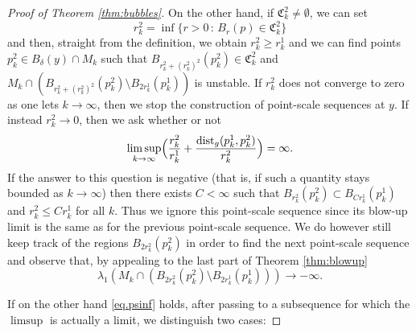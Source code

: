 \documentclass[10pt]{amsart}
\newcounter{cas}
\renewcommand{\thecas}{\Roman{cas}}
\newcommand{\sep}{\,:\,}
\DeclareMathOperator{\dist}{dist}
\theoremstyle{definition}
\begin{document}
\begin{proof}[Proof of Theorem \ref{thm:bubbles}]
On the other hand, if $\mathfrak{C}^2_k \neq \emptyset$, we can set
\[
r^2_k = \inf \bigl\{r>0 \sep B_r(p)\in \mathfrak{C}^2_k\bigr\}
\]
and then, straight from the definition, we obtain $r^2_k\geq r^1_k$
and we can find points $p^2_k\in B_\delta(y)\cap M_k$ such that $B_{r^2_k+(r^2_k)^2}(p^2_k)\in \mathfrak{C}^2_k$ and $M_k\cap (B_{r^2_k+(r^2_k)^2}(p^2_k)\setminus B_{2r^1_k}(p^1_k))$ is unstable. If $r^2_k$ does not converge to zero as one lets $k\to\infty$, then we stop the construction of point-scale sequences at $y$.
If instead $r^2_k\to 0$, then we ask whether or not
\begin{equation}\label{eq.psinf}
\limsup_{k\to \infty} \Bigl(\frac{r^2_k}{r^1_k} + \frac{\dist_g(p_k^1,p_k^2)}{r^2_k} \Bigr)= \infty.
\end{equation}
If the answer to this question is negative (that is, if such a quantity stays bounded as $k\to\infty$) then there exists $C<\infty$ such that $B_{r^2_k}(p^2_k)\subset B_{Cr^1_k}(p^1_k)$ and $r^2_k\leq C r^1_k$ for all $k$. Thus we ignore this point-scale sequence since its blow-up limit is the same as for the previous point-scale sequence. We do however still keep track of the regions $B_{2r^2_k}(p^2_k)$ in order to find the next point-scale sequence and observe that, by appealing to the last part of Theorem \ref{thm:blowup}
$$\lambda_1(M_k\cap (B_{2r^2_k}(p^2_k)\setminus B_{2r^1_k}(p^1_k))) \to -\infty.$$

If on the other hand \eqref{eq.psinf} holds, after passing to a subsequence for which the $\limsup$ is actually a limit, we distinguish two cases:

\renewcommand{\thecas}{\arabic{cas}}

\end{proof}
\end{document}
